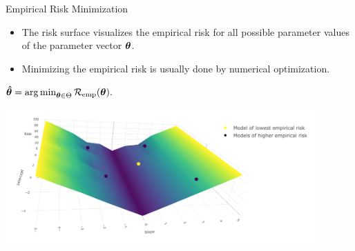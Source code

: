\documentclass[11pt,compress,t,notes=noshow, xcolor=table]{beamer}
\begin{document}
\begin{vbframe}{Empirical Risk Minimization}

\begin{itemize}
\item \small The risk surface visualizes the empirical risk for all possible parameter values of the parameter vector $\bm{\theta}$.
\item \small Minimizing the empirical risk is usually done by numerical optimization.
\end{itemize}

\begin{center}
$
\bm{\hat\theta} = \operatorname{arg\,min}_{\bm{\theta} \in \Theta} \mathcal{R}_{\text{emp}}(\bm{\theta}).
$
\end{center}


\begin{center}
 \includegraphics[width = 0.9\textwidth]{slides/ml-basics/figure_man/nutshell-ml-basics-risk-surface.png}
\end{center}





\end{vbframe}
\end{document}
